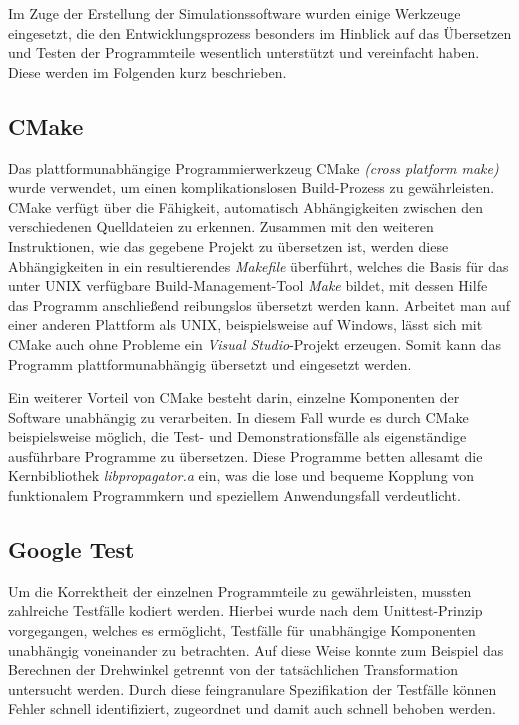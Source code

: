 Im Zuge der Erstellung der Simulationssoftware wurden einige Werkzeuge eingesetzt, die den Entwicklungsprozess besonders im Hinblick
auf das \"Ubersetzen und Testen der Programmteile wesentlich unterst\"utzt und vereinfacht haben.
Diese werden im Folgenden kurz beschrieben.

\subsection{CMake}
\label{sec:cmake}

Das plattformunabh\"angige Programmierwerkzeug CMake \textit{(cross platform make)} wurde verwendet, um einen komplikationslosen
Build-Prozess zu gew\"ahrleisten. CMake verf\"ugt \"uber die F\"ahigkeit, automatisch Abh\"angigkeiten zwischen den verschiedenen
Quelldateien zu erkennen. Zusammen mit den weiteren Instruktionen, wie das gegebene Projekt zu \"ubersetzen ist, werden diese
Abh\"angigkeiten in ein resultierendes \textit{Makefile} \"uberf\"uhrt, welches die Basis f\"ur das unter UNIX verf\"ugbare
Build-Management-Tool \textit{Make} bildet, mit dessen Hilfe das Programm anschlie{\ss}end reibungslos \"ubersetzt werden kann.
Arbeitet man auf einer anderen Plattform als UNIX, beispielsweise auf Windows, l\"asst sich mit
CMake auch ohne Probleme ein \textit{Visual Studio}-Projekt erzeugen. Somit kann das Programm plattformunabh\"angig \"ubersetzt und
eingesetzt werden.

Ein weiterer Vorteil von CMake besteht darin, einzelne Komponenten der Software unabh\"angig zu verarbeiten. In diesem Fall wurde
es durch CMake beispielsweise m\"oglich, die Test- und Demonstrationsf\"alle als eigenst\"andige ausf\"uhrbare Programme zu
\"ubersetzen. Diese Programme betten allesamt die Kernbibliothek \textit{libpropagator.a} ein, was die lose und bequeme Kopplung
von funktionalem Programmkern und speziellem Anwendungsfall verdeutlicht.

\subsection{Google Test}

Um die Korrektheit der einzelnen Programmteile zu gew\"ahrleisten, mussten zahlreiche Testf\"alle kodiert werden. Hierbei wurde
nach dem Unittest-Prinzip vorgegangen, welches es erm\"oglicht, Testf\"alle f\"ur unabh\"angige Komponenten unabh\"angig voneinander
zu betrachten. Auf diese Weise konnte zum Beispiel das Berechnen der Drehwinkel getrennt von der tats\"achlichen Transformation
untersucht werden. Durch diese feingranulare Spezifikation der Testf\"alle k\"onnen Fehler schnell identifiziert, zugeordnet
und damit auch schnell behoben werden.

